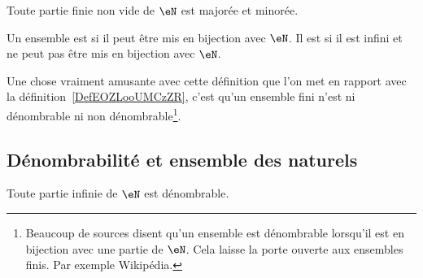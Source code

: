 \begin{lemma}       \label{LEMooKUWUooPLWelf}
	Toute partie finie non vide de \( \eN\) est majorée et minorée.
\end{lemma}


\begin{definition}\label{DefEnsembleDenombrable}
	Un ensemble est  si il peut être mis en bijection avec \( \eN\). Il est  si il est infini et ne peut pas être mis en bijection avec \( \eN\).
\end{definition}
Une chose vraiment amusante avec cette définition que l'on met en rapport avec la définition~\ref{DefEOZLooUMCzZR}, c'est qu'un ensemble fini n'est ni dénombrable ni non dénombrable\footnote{Beaucoup de sources disent qu'un ensemble est dénombrable lorsqu'il est en bijection avec une partie de \( \eN\). Cela laisse la porte ouverte aux ensembles finis. Par exemple Wikipédia\cite{ooLMVKooUiQUtb}.}.


\subsection{Dénombrabilité et ensemble des naturels}

\begin{proposition}      \label{PROPooOBKMooWEGCvM}
	Toute partie infinie de \( \eN\) est dénombrable.
\end{proposition}


